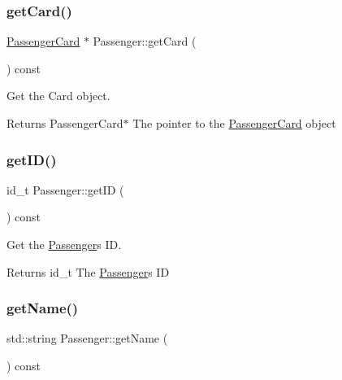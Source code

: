 \subsubsection{\texorpdfstring{get\+Card()}{getCard()}}
{\footnotesize\ttfamily \mbox{\hyperlink{classPassengerCard}{Passenger\+Card}} $\ast$ Passenger\+::get\+Card (\begin{DoxyParamCaption}{ }\end{DoxyParamCaption}) const}



Get the Card object. 

\begin{DoxyReturn}{Returns}
Passenger\+Card$\ast$ The pointer to the \mbox{\hyperlink{classPassengerCard}{Passenger\+Card}} object 
\end{DoxyReturn}
\mbox{\label{classPassenger_ae6fcc19037be144f654c623c5b78ae24}} 
\subsubsection{\texorpdfstring{get\+I\+D()}{getID()}}
{\footnotesize\ttfamily id\+\_\+t Passenger\+::get\+ID (\begin{DoxyParamCaption}{ }\end{DoxyParamCaption}) const}



Get the \mbox{\hyperlink{classPassenger}{Passenger}}\textquotesingle{}s ID. 

\begin{DoxyReturn}{Returns}
id\+\_\+t The \mbox{\hyperlink{classPassenger}{Passenger}}\textquotesingle{}s ID 
\end{DoxyReturn}
\mbox{\label{classPassenger_a7c919f6947817ff1c6a4ee51923c116f}} 
\subsubsection{\texorpdfstring{get\+Name()}{getName()}}
{\footnotesize\ttfamily std\+::string Passenger\+::get\+Name (\begin{DoxyParamCaption}{ }\end{DoxyParamCaption}) const}



